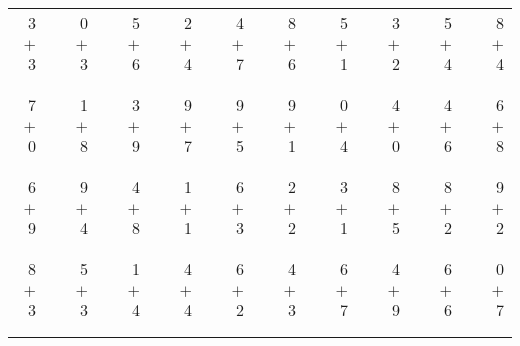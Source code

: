 \documentclass[12pt, letterpaper]{article}
\begin{document}
\begin{tabular}{rrrrrrrrrrrrrrrrrrr}
3 & & 0 & & 5 & & 2 & & 4 & & 8 & & 5 & & 3 & & 5 & & 8\\
$+$ 3 & & $+$ 3 & & $+$ 6 & & $+$ 4 & & $+$ 7 & & $+$ 6 & & $+$ 1 & & $+$ 2 & & $+$ 4 & & $+$ 4\\
\cline{1-1} \cline{3-3} \cline{5-5} \cline{7-7} \cline{9-9} \cline{11-11} \cline{13-13} \cline{15-15} \cline{17-17} \cline{19-19} \\ \\
7 & & 1 & & 3 & & 9 & & 9 & & 9 & & 0 & & 4 & & 4 & & 6\\
$+$ 0 & & $+$ 8 & & $+$ 9 & & $+$ 7 & & $+$ 5 & & $+$ 1 & & $+$ 4 & & $+$ 0 & & $+$ 6 & & $+$ 8\\
\cline{1-1} \cline{3-3} \cline{5-5} \cline{7-7} \cline{9-9} \cline{11-11} \cline{13-13} \cline{15-15} \cline{17-17} \cline{19-19} \\ \\
6 & & 9 & & 4 & & 1 & & 6 & & 2 & & 3 & & 8 & & 8 & & 9\\
$+$ 9 & & $+$ 4 & & $+$ 8 & & $+$ 1 & & $+$ 3 & & $+$ 2 & & $+$ 1 & & $+$ 5 & & $+$ 2 & & $+$ 2\\
\cline{1-1} \cline{3-3} \cline{5-5} \cline{7-7} \cline{9-9} \cline{11-11} \cline{13-13} \cline{15-15} \cline{17-17} \cline{19-19} \\ \\
8 & & 5 & & 1 & & 4 & & 6 & & 4 & & 6 & & 4 & & 6 & & 0\\
$+$ 3 & & $+$ 3 & & $+$ 4 & & $+$ 4 & & $+$ 2 & & $+$ 3 & & $+$ 7 & & $+$ 9 & & $+$ 6 & & $+$ 7\\
\cline{1-1} \cline{3-3} \cline{5-5} \cline{7-7} \cline{9-9} \cline{11-11} \cline{13-13} \cline{15-15} \cline{17-17} \cline{19-19} \\ \\
\end{tabular}
\newpage
\end{document}
